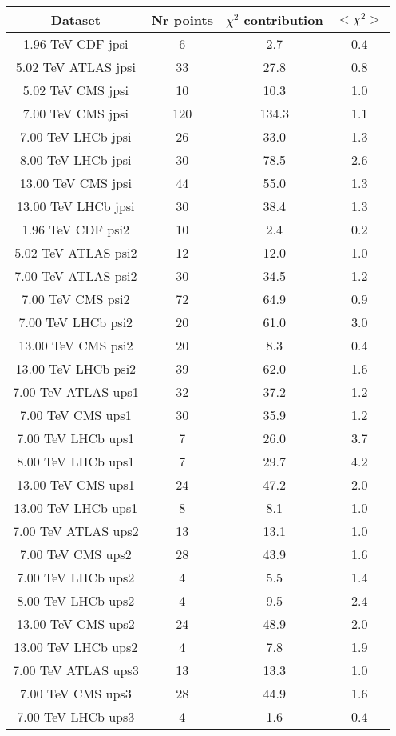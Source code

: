 \begin{table}[h!]
\centering
\begin{tabular}{c|c|c|c}
Dataset & Nr points & $\chi^2$ contribution & $<\chi^2>$ \\
\hline
1.96 TeV CDF jpsi & 6 & 2.7 & 0.4 \\
5.02 TeV ATLAS jpsi & 33 & 27.8 & 0.8 \\
5.02 TeV CMS jpsi & 10 & 10.3 & 1.0 \\
7.00 TeV CMS jpsi & 120 & 134.3 & 1.1 \\
7.00 TeV LHCb jpsi & 26 & 33.0 & 1.3 \\
8.00 TeV LHCb jpsi & 30 & 78.5 & 2.6 \\
13.00 TeV CMS jpsi & 44 & 55.0 & 1.3 \\
13.00 TeV LHCb jpsi & 30 & 38.4 & 1.3 \\
1.96 TeV CDF psi2 & 10 & 2.4 & 0.2 \\
5.02 TeV ATLAS psi2 & 12 & 12.0 & 1.0 \\
7.00 TeV ATLAS psi2 & 30 & 34.5 & 1.2 \\
7.00 TeV CMS psi2 & 72 & 64.9 & 0.9 \\
7.00 TeV LHCb psi2 & 20 & 61.0 & 3.0 \\
13.00 TeV CMS psi2 & 20 & 8.3 & 0.4 \\
13.00 TeV LHCb psi2 & 39 & 62.0 & 1.6 \\
7.00 TeV ATLAS ups1 & 32 & 37.2 & 1.2 \\
7.00 TeV CMS ups1 & 30 & 35.9 & 1.2 \\
7.00 TeV LHCb ups1 & 7 & 26.0 & 3.7 \\
8.00 TeV LHCb ups1 & 7 & 29.7 & 4.2 \\
13.00 TeV CMS ups1 & 24 & 47.2 & 2.0 \\
13.00 TeV LHCb ups1 & 8 & 8.1 & 1.0 \\
7.00 TeV ATLAS ups2 & 13 & 13.1 & 1.0 \\
7.00 TeV CMS ups2 & 28 & 43.9 & 1.6 \\
7.00 TeV LHCb ups2 & 4 & 5.5 & 1.4 \\
8.00 TeV LHCb ups2 & 4 & 9.5 & 2.4 \\
13.00 TeV CMS ups2 & 24 & 48.9 & 2.0 \\
13.00 TeV LHCb ups2 & 4 & 7.8 & 1.9 \\
7.00 TeV ATLAS ups3 & 13 & 13.3 & 1.0 \\
7.00 TeV CMS ups3 & 28 & 44.9 & 1.6 \\
7.00 TeV LHCb ups3 & 4 & 1.6 & 0.4 \\

\end{tabular}
\end{table}
